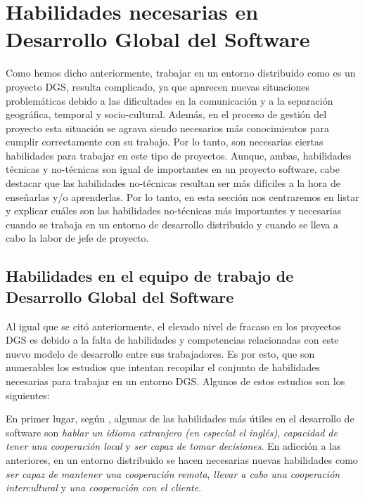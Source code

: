 \section{Habilidades necesarias en Desarrollo Global del Software}
\label{sec:HabilidadesDGS}

Como hemos dicho anteriormente, trabajar en un entorno distribuido como es un proyecto DGS, resulta complicado, ya que aparecen nuevas situaciones problemáticas debido a las dificultades en la comunicación y a la separación geográfica, temporal y socio-cultural. Además, en el proceso de gestión del proyecto esta situación se agrava siendo necesarios más conocimientos para cumplir correctamente con su trabajo. Por lo tanto, son necesarias ciertas habilidades para trabajar en este tipo de proyectos. Aunque, ambas, habilidades técnicas y no-técnicas son igual de importantes en un proyecto software, cabe destacar que las habilidades no-técnicas resultan ser más difíciles a la hora de enseñarlas y/o aprenderlas. Por lo tanto, en esta sección nos centraremos en listar y explicar cuáles son las habilidades no-técnicas más importantes y necesarias cuando se trabaja en un entorno de desarrollo distribuido y cuando se lleva a cabo la labor de jefe de proyecto.

\subsection{Habilidades en el equipo de trabajo de Desarrollo Global del Software}
\label{sec:HabilidadesT}

Al igual que se citó anteriormente, el elevado nivel de fracaso en los proyectos DGS es debido a la falta de habilidades y competencias relacionadas con este nuevo modelo de desarrollo entre sus trabajadores. Es por esto, que son numerables los estudios que intentan recopilar el conjunto de habilidades necesarias para trabajar en un entorno DGS. Algunos de estos estudios son los siguientes:

En primer lugar, según \cite{bosnic2019assessing}, algunas de las habilidades más útiles en el desarrollo de software son \emph{hablar un idioma extranjero (en especial el inglés)}, \emph{capacidad de tener una cooperación local} y \emph{ser capaz de tomar decisiones}. En adicción a las anteriores, en un entorno distribuido se hacen necesarias nuevas habilidades como \emph{ser capaz de mantener una cooperación remota}, \emph{llevar a cabo una cooperación intercultural} y \emph{una cooperación con el cliente}.

